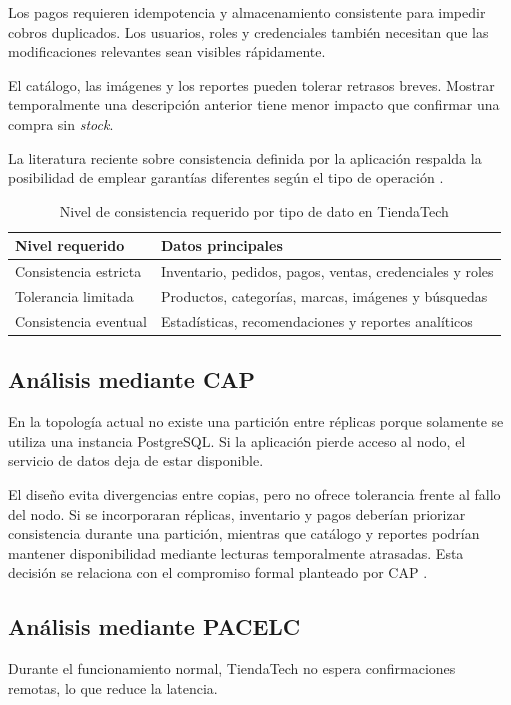 \documentclass[11pt,a4paper]{article}
\begin{document}
Los pagos requieren idempotencia y almacenamiento consistente para impedir cobros duplicados. Los usuarios, roles y credenciales también necesitan que las modificaciones relevantes sean visibles rápidamente.

El catálogo, las imágenes y los reportes pueden tolerar retrasos breves. Mostrar temporalmente una descripción anterior tiene menor impacto que confirmar una compra sin \textit{stock}.

La literatura reciente sobre consistencia definida por la aplicación respalda la posibilidad de emplear garantías diferentes según el tipo de operación \cite{li2022}.

\begin{table}[H]
    \centering
    \caption{Nivel de consistencia requerido por tipo de dato en TiendaTech}
    \label{tab:requisitos}
    \begin{tabular}{@{}ll@{}}
        \toprule
        \textbf{Nivel requerido} & \textbf{Datos principales} \\
        \midrule
        Consistencia estricta   & Inventario, pedidos, pagos, ventas, credenciales y roles \\
        Tolerancia limitada     & Productos, categorías, marcas, imágenes y búsquedas \\
        Consistencia eventual   & Estadísticas, recomendaciones y reportes analíticos \\
        \bottomrule
    \end{tabular}
\end{table}

\subsection{Análisis mediante CAP}
En la topología actual no existe una partición entre réplicas porque solamente se utiliza una instancia PostgreSQL. Si la aplicación pierde acceso al nodo, el servicio de datos deja de estar disponible.

El diseño evita divergencias entre copias, pero no ofrece tolerancia frente al fallo del nodo. Si se incorporaran réplicas, inventario y pagos deberían priorizar consistencia durante una partición, mientras que catálogo y reportes podrían mantener disponibilidad mediante lecturas temporalmente atrasadas. Esta decisión se relaciona con el compromiso formal planteado por CAP \cite{gilbert2002}.

\subsection{Análisis mediante PACELC}
Durante el funcionamiento normal, TiendaTech no espera confirmaciones remotas, lo que reduce la latencia.
\end{document}
